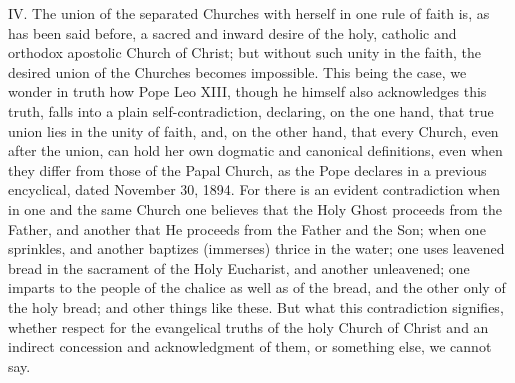 IV. The union of the separated Churches with herself in one rule of
faith is, as has been said before, a sacred and inward desire of the
holy, catholic and orthodox apostolic Church of Christ; but without such
unity in the faith, the desired union of the Churches becomes
impossible. This being the case, we wonder in truth how Pope Leo XIII,
though he himself also acknowledges this truth, falls into a plain
self-contradiction, declaring, on the one hand, that true union lies in
the unity of faith, and, on the other hand, that every Church, even
after the union, can hold her own dogmatic and canonical definitions,
even when they differ from those of the Papal Church, as the Pope
declares in a previous encyclical, dated November 30, 1894. For there is
an evident contradiction when in one and the same Church one believes
that the Holy Ghost proceeds from the Father, and another that He
proceeds from the Father and the Son; when one sprinkles, and another
baptizes (immerses) thrice in the water; one uses leavened bread in the
sacrament of the Holy Eucharist, and another unleavened; one imparts to
the people of the chalice as well as of the bread, and the other only of
the holy bread; and other things like these. But what this contradiction
signifies, whether respect for the evangelical truths of the holy Church
of Christ and an indirect concession and acknowledgment of them, or
something else, we cannot say.

